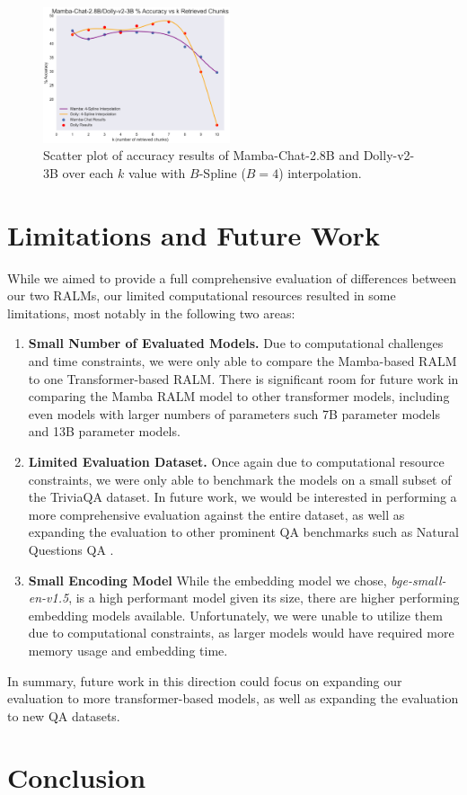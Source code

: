 \documentclass[11pt]{article}
\begin{document}
\begin{figure}[!htbp]
    \centering
    \includegraphics[width=0.49\textwidth]{rag-results-over-k.png}
    \caption{Scatter plot of accuracy results of Mamba-Chat-2.8B and Dolly-v2-3B over each $k$ value with $B$-Spline ($B=4$) interpolation.}
    \label{fig:mamba-chat-results}
\end{figure}

\section{Limitations and Future Work}
While we aimed to provide a full comprehensive evaluation of differences between our two RALMs, our limited computational resources resulted in some limitations, most notably in the following two areas:
\begin{enumerate}
    \item \textbf{Small Number of Evaluated Models.} Due to computational challenges and time constraints, we were only able to compare the Mamba-based RALM to one Transformer-based RALM. There is significant room for future work in comparing the Mamba RALM model to other transformer models, including even models with larger numbers of parameters such 7B parameter models and 13B parameter models.
    \item \textbf{Limited Evaluation Dataset.} Once again due to computational resource constraints, we were only able to benchmark the models on a small subset of the TriviaQA dataset. In future work, we would be interested in performing a more comprehensive evaluation against the entire dataset, as well as expanding the evaluation to other prominent QA benchmarks such as Natural Questions QA \cite{kwiatkowski-etal-2019-natural}.
    \item \textbf{Small Encoding Model} While the embedding model we chose, \textit{bge-small-en-v1.5}, is a high performant model given its size, there are higher performing embedding models available. Unfortunately, we were unable to utilize them due to computational constraints, as larger models would have required more memory usage and embedding time.
\end{enumerate}
In summary, future work in this direction could focus on expanding our evaluation to more transformer-based models, as well as expanding the evaluation to new QA datasets.
\section{Conclusion}







\end{document}
